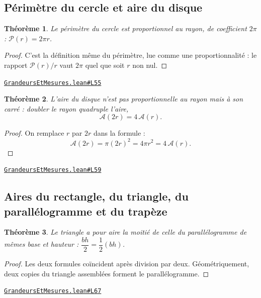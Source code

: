 \documentclass[11pt,a4paper]{article}
\theoremstyle{definition}
\theoremstyle{plain}
\newtheorem{theoreme}{Théorème}
\newcommand{\source}[2]{\par\smallskip\noindent\hfill{\footnotesize\href{#1}{\texttt{#2}}}\par\smallskip}
\begin{document}
\subsection{Périmètre du cercle et aire du disque}

\begin{theoreme}
Le périmètre du cercle est proportionnel au rayon, de coefficient $2\pi$ :
$\mathcal{P}(r) = 2\pi r$.
\end{theoreme}

\begin{proof}
C'est la définition même du périmètre, lue comme une proportionnalité : le rapport
$\mathcal{P}(r)/r$ vaut $2\pi$ quel que soit $r$ non nul.
\end{proof}
\source{https://github.com/Commutator-IO/learn-lean/blob/main/courses/01-college/04-grandeurs-et-mesures/GrandeursEtMesures.lean\#L55}{GrandeursEtMesures.lean\#L55}

\begin{theoreme}
L'aire du disque n'est pas proportionnelle au rayon mais à son carré : doubler le
rayon quadruple l'aire,
\[ \mathcal{A}(2r) = 4\,\mathcal{A}(r) . \]
\end{theoreme}

\begin{proof}
On remplace $r$ par $2r$ dans la formule :
\[ \mathcal{A}(2r) = \pi (2r)^2 = 4\pi r^2 = 4\,\mathcal{A}(r) . \]
\end{proof}
\source{https://github.com/Commutator-IO/learn-lean/blob/main/courses/01-college/04-grandeurs-et-mesures/GrandeursEtMesures.lean\#L59}{GrandeursEtMesures.lean\#L59}

\subsection{Aires du rectangle, du triangle, du parallélogramme et du trapèze}

\begin{theoreme}
Le triangle a pour aire la moitié de celle du parallélogramme de mêmes base et
hauteur : $\dfrac{bh}{2} = \dfrac{1}{2}(bh)$.
\end{theoreme}

\begin{proof}
Les deux formules coïncident après division par deux. Géométriquement, deux copies du
triangle assemblées forment le parallélogramme.
\end{proof}
\source{https://github.com/Commutator-IO/learn-lean/blob/main/courses/01-college/04-grandeurs-et-mesures/GrandeursEtMesures.lean\#L67}{GrandeursEtMesures.lean\#L67}
\end{document}
